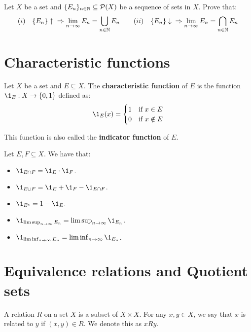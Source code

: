 \begin{fexercise}
    Let $X$ be a set and $\{E_n\}_{n \in \mathbb{N}} \subseteq \mathcal{P}(X)$ be a sequence of sets in $X$.
    Prove that:
    $$(i) \quad \{E_n\} \uparrow \;\; \Rightarrow \lim_{n \to \infty} E_n = \bigcup_{n \in \mathbb{N}} E_n \qquad (ii) \quad \{E_n\} \downarrow \;\; \Rightarrow \lim_{n \to \infty} E_n = \bigcap_{n \in \mathbb{N}} E_n$$
\end{fexercise}

\section{Characteristic functions}

\begin{fdefinition}
    Let $X$ be a set and $E \subseteq X$. The \textbf{characteristic function} of $E$ is
    the function $\1_E: X \to \{0, 1\}$ defined as:
    $$\1_E(x) = \begin{cases}
        1 & \text{if } x \in E \\
        0 & \text{if } x \notin E
    \end{cases}$$

    This function is also called the \textbf{indicator function} of $E$.
\end{fdefinition}

\begin{fremark}
    Let $E, F \subseteq X$. We have that:
    \begin{itemize}
        \item $\1_{E \cap F} = \1_E \cdot \1_F$.
        \item $\1_{E \cup F} = \1_E + \1_F - \1_{E \cap F}$.
        \item $\1_{E^c} = 1 - \1_E$.
        \item $\1_{\limsup_{n \to \infty} E_n} = \limsup_{n \to \infty} \1_{E_n}$.
        \item $\1_{\liminf_{n \to \infty} E_n} = \liminf_{n \to \infty} \1_{E_n}$.
    \end{itemize}
\end{fremark}

\section{Equivalence relations and Quotient sets}

\begin{fdefinition}
    A relation $R$ on a set $X$ is a subset of $X \times X$. For any $x, y \in X$,
    we say that $x$ is related to $y$ if $(x, y) \in R$. We denote this as $xRy$.
\end{fdefinition}

